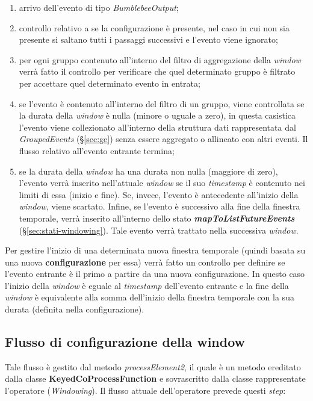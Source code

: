 \begin{enumerate}
	\item{arrivo dell'evento di tipo \textit{BumblebeeOutput};}
	\item{controllo relativo a se la configurazione è presente, nel caso in cui non sia presente si saltano tutti i passaggi successivi e l'evento viene ignorato;}
	\item{per ogni gruppo contenuto all'interno del filtro di aggregazione della \textit{window} verrà fatto il controllo per verificare che quel determinato gruppo è filtrato per accettare quel determinato evento in entrata;}
\item{se l'evento è contenuto all'interno del filtro di un gruppo, viene controllata se la durata della \textit{window} è nulla (minore o uguale a zero), in questa casistica l'evento viene collezionato all'interno della struttura dati rappresentata dal \textit{GroupedEvents} (\S\ref{sec:ge}) senza essere aggregato o allineato con altri eventi. Il flusso relativo all'evento entrante termina;}
\item{se la durata della \textit{window} ha una durata non nulla (maggiore di zero), l'evento verrà inserito nell'attuale \textit{window} se il suo \textit{\gls{timestamp}} è contenuto nei limiti di essa (inizio e fine). Se, invece, l'evento è antecedente all'inizio della \textit{window}, viene scartato. Infine, se l'evento è successivo alla fine della finestra temporale, verrà inserito all'interno dello stato \textbf{\textit{mapToListFutureEvents}} (\S\ref{sec:stati-windowing}). Tale evento verrà trattato nella successiva \textit{window}.}
\end{enumerate}

Per gestire l'inizio di una determinata nuova finestra temporale (quindi basata su una nuova \textbf{configurazione} per essa) verrà fatto un controllo per definire se l'evento entrante è il primo a partire da una nuova configurazione. In questo caso l'inizio della \textit{window} è eguale al \textit{\gls{timestamp}} dell'evento entrante e la fine della \textit{window} è equivalente alla somma dell'inizio della finestra temporale con la sua durata (definita nella configurazione).
\subsection{Flusso di configurazione della window}\label{sec:pr2-windowing}
Tale flusso è gestito dal metodo \textit{processElement2}, il quale è un metodo ereditato dalla classe \textbf{KeyedCoProcessFunction} e sovrascritto dalla classe rappresentate l'operatore (\textit{Windowing}). Il flusso attuale dell'operatore prevede questi \textit{step}:

